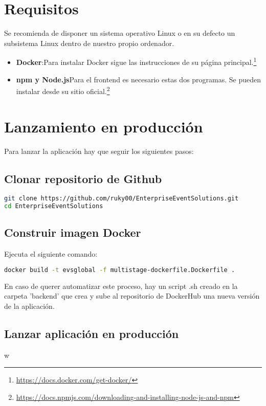 \section{Requisitos}
Se recomienda de disponer un sistema operativo Linux o en su defecto un subsistema Linux dentro de nuestro propio ordenador.
    \begin{itemize}
        \item  \textbf{Docker}:Para instalar Docker sigue las instrucciones de su página principal.\footnote{\href{https://docs.docker.com/get-docker/}{https://docs.docker.com/get-docker/}} 
        \item  \textbf{npm y Node.js}Para el frontend es necesario estas dos programas. Se pueden instalar desde su sitio oficial.\footnote{\href{https://docs.npmjs.com/downloading-and-installing-node-js-and-npm}{https://docs.npmjs.com/downloading-and-installing-node-js-and-npm}} 
    \end{itemize}
\section{Lanzamiento en producción}
Para lanzar la aplicación hay que seguir los siguientes pasos:
\subsection{Clonar repositorio de Github}
\begin{lstlisting}[language=Bash, caption=Script clonar repositorio, label=lst:clonarRepo]
git clone https://github.com/ruky00/EnterpriseEventSolutions.git
cd EnterpriseEventSolutions
\end{lstlisting}

\subsection{Construir imagen Docker}
Ejecuta el siguiente comando:
\begin{lstlisting}[language=Bash, caption=Crear imagen Docker, label=lst:constImagen]
docker build -t evsglobal -f multistage-dockerfile.Dockerfile .
\end{lstlisting}

En caso de querer automatizar este proceso, hay un script .sh creado en la carpeta 'backend' que crea y sube al repositorio de DockerHub una nueva versión de la aplicación.

\subsection{Lanzar aplicación en producción}
w
